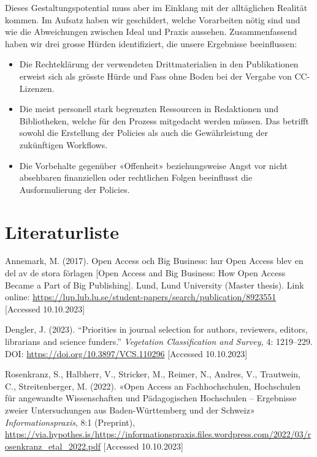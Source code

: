 \documentclass[a4paper,
fontsize=11pt,
oneside,
numbers=noperiodatend,
parskip=half-,
bibliography=totoc,
final
]{scrartcl}
\begin{document}
Dieses Gestaltungspotential muss aber im Einklang mit der alltäglichen
Realität kommen. Im Aufsatz haben wir geschildert, welche Vorarbeiten
nötig sind und wie die Abweichungen zwischen Ideal und Praxis aussehen.
Zusammenfassend haben wir drei grosse Hürden identifiziert, die unsere
Ergebnisse beeinflussen:

\begin{itemize}
\tightlist
\item
  Die Rechteklärung der verwendeten Drittmaterialien in den
  Publikationen erweist sich als grösste Hürde und Fass ohne Boden bei
  der Vergabe von CC-Lizenzen.
\item
  Die meist personell stark begrenzten Ressourcen in Redaktionen und
  Bibliotheken, welche für den Prozess mitgedacht werden müssen. Das
  betrifft sowohl die Erstellung der Policies als auch die
  Gewährleistung der zukünftigen Workflows.
\item
  Die Vorbehalte gegenüber «Offenheit» beziehungsweise Angst vor nicht
  absehbaren finanziellen oder rechtlichen Folgen beeinflusst die
  Ausformulierung der Policies.
\end{itemize}

\hypertarget{literaturliste}{%
\section{Literaturliste}\label{literaturliste}}

Annemark, M. (2017). Open Access och Big Business: hur Open Access blev
en del av de stora förlagen {[}Open Access and Big Business: How Open
Access Became a Part of Big Publishing{]}. Lund, Lund University (Master
thesis). Link online:
\url{https://lup.lub.lu.se/student-papers/search/publication/8923551}
{[}Accessed 10.10.2023{]}

Dengler, J. (2023). \enquote{Priorities in journal selection for
authors, reviewers, editors, librarians and science funders.}
\emph{Vegetation Classification and Survey,} 4: 1219--229. DOI:
\url{https://doi.org/10.3897/VCS.110296} {[}Accessed 10.10.2023{]}

Rosenkranz, S., Halbherr, V., Stricker, M., Reimer, N., Andres, V.,
Trautwein, C., Streitenberger, M. (2022). «Open Access an
Fachhochschulen, Hochschulen für angewandte Wissenschaften und
Pädagogischen Hochschulen -- Ergebnisse zweier Untersuchungen aus
Baden-Württemberg und der Schweiz» \emph{Informationspraxis}, 8:1
(Preprint),
\url{https://via.hypothes.is/https://informationspraxis.files.wordpress.com/2022/03/rosenkranz_etal_2022.pdf}
{[}Accessed 10.10.2023{]}
\end{document}
